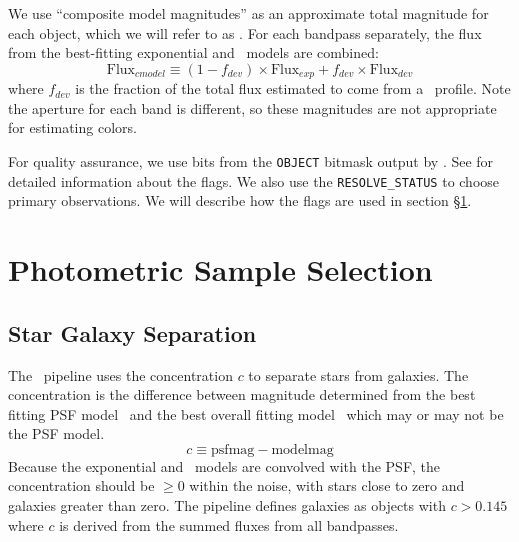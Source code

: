 \documentclass[preprint]{aastex}
\begin{document}
We use ``composite model magnitudes'' as an approximate total magnitude for
each object, which we will refer to as \cmodelmag.  For each bandpass
separately, the flux from the best-fitting exponential and \devauc\ models are
combined:
\begin{equation}
\textrm{Flux}_{cmodel} \equiv (1-f_{dev})\times \textrm{Flux}_{exp} + f_{dev} \times \textrm{Flux}_{dev}
\end{equation}
where $f_{dev}$ is the fraction of the total flux estimated to come from a
\devauc\ profile\citep{dr7photo}.  Note the aperture for each band is
different, so these magnitudes are not appropriate for estimating colors.

For quality assurance, we use bits from the \texttt{OBJECT} bitmask output by
\photo.  See \citet{dr7flags} for detailed information about the flags.    We
also use the \texttt{RESOLVE\_STATUS} \citep{dr7resolve} to choose primary
observations.  We will describe how the flags are used in section \S \ref{sec:select}.

    

\section{Photometric Sample Selection} \label{sec:select}

\subsection{Star Galaxy Separation}

The \photo\ pipeline uses the concentration $c$ to separate stars from
galaxies.  The concentration is the difference between magnitude determined
from the best fitting PSF model \psfmag\ and the best overall fitting model 
\modelmag\ which may or may not be the PSF model.
\begin{equation}
c \equiv \textrm{psfmag} - \textrm{modelmag}
\end{equation}
Because the exponential and \devauc\ models are convolved with the PSF, the
concentration should be $\ge 0$ within the noise, with stars close to zero and
galaxies greater than zero.  The pipeline defines galaxies as objects with $c >
0.145$ \citep{dr7classify} where $c$ is derived from the summed fluxes from all
bandpasses.  
\end{document}
